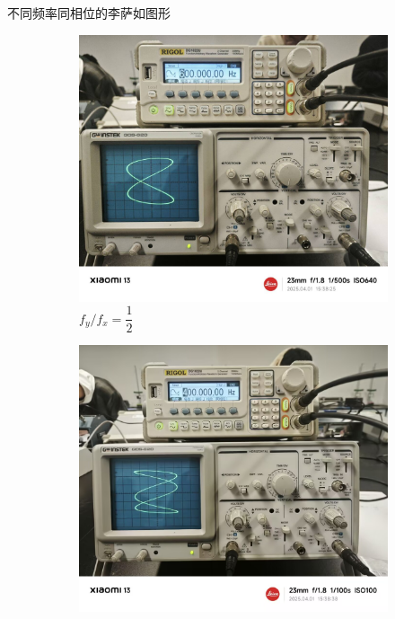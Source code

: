 \documentclass[12pt,a4paper]{article}
\begin{document}
	不同频率同相位的李萨如图形
	\begin{figure}[H]
		\centering
		\begin{subfigure}[b]{0.23\textwidth}
			\centering
			\includegraphics[width=\textwidth]{600.jpg}
			\caption{$f_y/f_x=\dfrac{1}{2}$}
			\label{fig:subLissajous1-2}
		\end{subfigure}
		\hfill
		\begin{subfigure}[b]{0.23\textwidth}
			\centering
			\includegraphics[width=\textwidth]{400.jpg}

\end{subfigure}
\end{figure}
\end{document}
